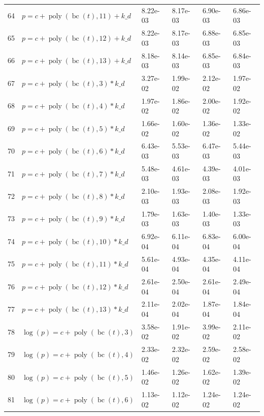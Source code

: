 \documentclass[12pt,a4paper]{article}
\DeclareMathOperator{\bc}{bc}
\DeclareMathOperator{\poly}{poly}
\begin{document}
\begin{longtable}[t]{ll>{\raggedleft\arraybackslash}p{2cm}>{\raggedleft\arraybackslash}p{2cm}>{\raggedleft\arraybackslash}p{2cm}>{\raggedleft\arraybackslash}p{2cm}}
64 & $p = c + \poly\left( \bc(t), 11 \right) + k\_d$ & 8.22e-03 & 8.17e-03 & 6.90e-03 & 6.86e-03\\
\rowcolor{gray!6}  65 & $p = c + \poly\left( \bc(t), 12 \right) + k\_d$ & 8.22e-03 & 8.17e-03 & 6.88e-03 & 6.85e-03\\
66 & $p = c + \poly\left( \bc(t), 13 \right) + k\_d$ & 8.18e-03 & 8.14e-03 & 6.85e-03 & 6.84e-03\\
\rowcolor{gray!6}  67 & $p = c + \poly\left( \bc(t), 3 \right) * k\_d$ & 3.27e-02 & 1.99e-02 & 2.12e-02 & 1.97e-02\\
68 & $p = c + \poly\left( \bc(t), 4 \right) * k\_d$ & 1.97e-02 & 1.86e-02 & 2.00e-02 & 1.92e-02\\
\rowcolor{gray!6}  69 & $p = c + \poly\left( \bc(t), 5 \right) * k\_d$ & 1.66e-02 & 1.60e-02 & 1.36e-02 & 1.33e-02\\
70 & $p = c + \poly\left( \bc(t), 6 \right) * k\_d$ & 6.43e-03 & 5.53e-03 & 6.47e-03 & 5.44e-03\\
\rowcolor{gray!6}  71 & $p = c + \poly\left( \bc(t), 7 \right) * k\_d$ & 5.48e-03 & 4.61e-03 & 4.39e-03 & 4.01e-03\\
72 & $p = c + \poly\left( \bc(t), 8 \right) * k\_d$ & 2.10e-03 & 1.93e-03 & 2.08e-03 & 1.92e-03\\
\rowcolor{gray!6}  73 & $p = c + \poly\left( \bc(t), 9 \right) * k\_d$ & 1.79e-03 & 1.63e-03 & 1.40e-03 & 1.33e-03\\
74 & $p = c + \poly\left( \bc(t), 10 \right) * k\_d$ & 6.92e-04 & 6.11e-04 & 6.83e-04 & 6.00e-04\\
\rowcolor{gray!6}  75 & $p = c + \poly\left( \bc(t), 11 \right) * k\_d$ & 5.61e-04 & 4.93e-04 & 4.35e-04 & 4.11e-04\\
76 & $p = c + \poly\left( \bc(t), 12 \right) * k\_d$ & 2.61e-04 & 2.50e-04 & 2.61e-04 & 2.49e-04\\
\rowcolor{gray!6}  77 & $p = c + \poly\left( \bc(t), 13 \right) * k\_d$ & 2.11e-04 & 2.02e-04 & 1.87e-04 & 1.84e-04\\
78 & $\log(p) = c + \poly\left( \bc(t), 3 \right)$ & 3.58e-02 & 1.91e-02 & 3.99e-02 & 2.11e-02\\
\rowcolor{gray!6}  79 & $\log(p) = c + \poly\left( \bc(t), 4 \right)$ & 2.33e-02 & 2.32e-02 & 2.59e-02 & 2.58e-02\\
80 & $\log(p) = c + \poly\left( \bc(t), 5 \right)$ & 1.46e-02 & 1.26e-02 & 1.62e-02 & 1.39e-02\\
\rowcolor{gray!6}  81 & $\log(p) = c + \poly\left( \bc(t), 6 \right)$ & 1.13e-02 & 1.12e-02 & 1.24e-02 & 1.24e-02\\

\end{longtable}
\end{document}
